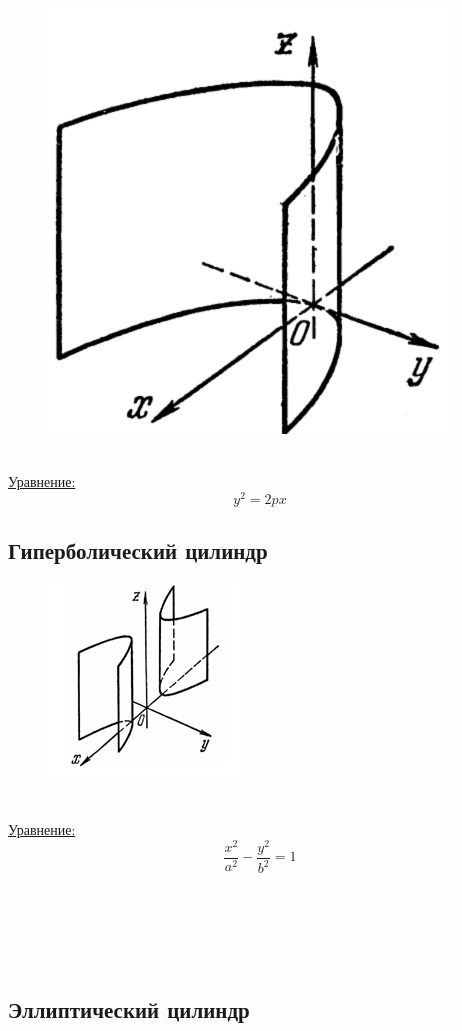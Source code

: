 \begin{figure}
    \includegraphics[width=.5\linewidth]{images/параболический цилиндр.png}
\end{figure}

\tab\\

\underline{Уравнение:}
\[
y^2 = 2px
\]
\clearpage
\subsection{Гиперболический цилиндр}

\begin{figure}
    \includegraphics[width=.5\linewidth]{images/гиперболический цилиндр.png}
\end{figure}

\tab\\

\underline{Уравнение:}
\[
\dfrac{x^2}{a^2} - \dfrac{y^2}{b^2} = 1
\]

\tab\\ \tab\\ \tab\\ \tab\\ 
\subsection{Эллиптический цилиндр}

